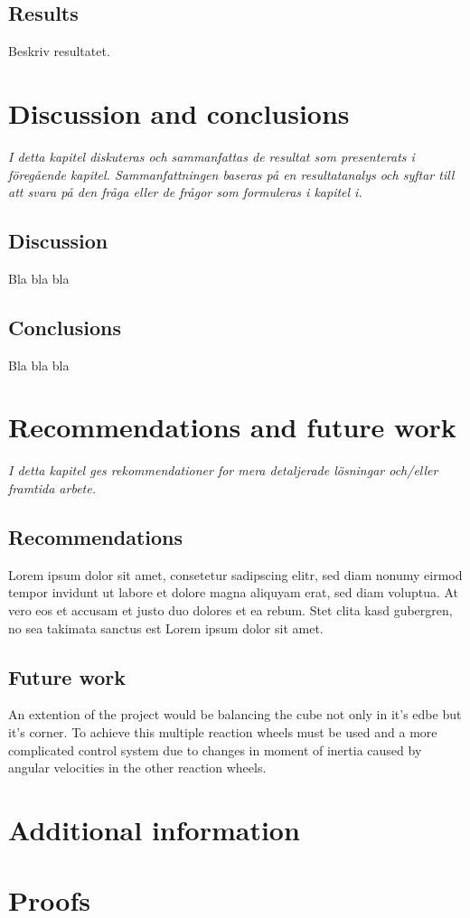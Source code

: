 \documentclass[a4paper,11pt]{kth-mag}
\begin{document}
\section{Results}
Beskriv resultatet.


\chapter{Discussion and conclusions}
\emph{I detta kapitel diskuteras och sammanfattas de resultat som presenterats i föregående kapitel. Sammanfattningen baseras på en resultatanalys och syftar till att svara på den fråga eller de frågor som formuleras i kapitel i.}

\section{Discussion}
Bla bla bla

\section{Conclusions}
Bla bla bla


\chapter{Recommendations and future work}
\emph{I detta kapitel ges rekommendationer for mera detaljerade lösningar och/eller framtida arbete.}

\section{Recommendations}
Lorem ipsum dolor sit amet, consetetur sadipscing elitr, sed diam nonumy eirmod tempor invidunt ut labore et dolore magna aliquyam erat, sed diam voluptua. At vero eos et accusam et justo duo dolores et ea rebum. Stet clita kasd gubergren, no sea takimata sanctus est Lorem ipsum dolor sit amet.

\section{Future work}
An extention of the project would be balancing the cube not only in it's edbe but it's corner. To achieve this multiple reaction wheels must be used and a more complicated control system due to changes in moment of inertia caused by angular velocities in the other reaction wheels.

%
\cleardoublepage



\cleardoublepage
\appendix
{}


\chapter{Additional information} \label{appA}

\chapter{Proofs} \label{appB}

\cleardoublepage   
\cleartoverso %
%
\end{document}

